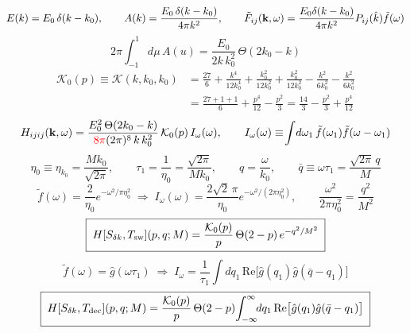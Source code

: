 \documentclass[10pt,prd,aps,nobibnotes,superscriptaddress,preprintnumbers,notitlepage]{revtex4-1}
\newcommand{\add}[1]{{\color{red}#1}}
\newcommand{\add}[1]{#1}
\newcommand{\khat}{\hat{k}}
\newcommand{\kb}{{\bf k}}
\newcommand{\tf}{\tilde{f}}
\begin{document}
\begin{equation}
  E(k)=E_0\,\delta(k-k_0),
  \qquad
  A(k)=\frac{E_0\,\delta(k-k_0)}{4\pi k^2},
  \qquad
  \tilde F_{ij}(\kb,\omega)=\frac{E_0\delta(k-k_0)}{4\pi k^2}P_{ij}(\khat)\tf(\omega)
  \label{A:Fdeltak}
\end{equation}
\begin{equation}
  2\pi\!\int_{-1}^{1}\!\!d\mu\,A(u)=\frac{E_0}{2k\,k_0^2}\,\Theta(2k_0-k)
  \label{A:angulardelta}
\end{equation}
\begin{align}
  \mathcal{K}_0(p)\equiv\mathcal{K}(k,k_0,k_0)
  &=\frac{27}{6}+\frac{k^4}{12k_0^4}+\frac{k_0^2}{12k_0^2}+\frac{k_0^2}{12k_0^2}
   -\frac{k^2}{6k_0^2}-\frac{k^2}{6k_0^2}
  \nonumber\\
  &=\frac{27+1+1}{6}+\frac{p^4}{12}-\frac{p^2}{3}
   =\frac{14}{3}-\frac{p^2}{3}+\frac{p^4}{12}
  \label{A:K0}
\end{align}
\begin{equation}
  H_{ijij}(\kb,\omega)=\frac{E_0^2\,\Theta(2k_0-k)}{\add{8\pi}(2\pi)^8\,k\,k_0^2}\,\mathcal{K}_0(p)\,I_\omega(\omega),
  \qquad
  I_\omega(\omega)\equiv\!\int\!d\omega_1\,\tf(\omega_1)\tf(\omega-\omega_1)
  \label{A:Hdeltak}
\end{equation}
\begin{equation}
  \eta_0\equiv\eta_{k_0}=\frac{M k_0}{\sqrt{2\pi}},
  \qquad
  \tau_1=\frac{1}{\eta_0}=\frac{\sqrt{2\pi}}{M k_0},
  \qquad
  q=\frac{\omega}{k_0},
  \qquad
  \bar q\equiv\omega\tau_1=\frac{\sqrt{2\pi}\,q}{M}
  \label{A:eta0}
\end{equation}
\begin{equation}
  \tf(\omega)=\frac{2}{\eta_0}e^{-\omega^2/\pi\eta_0^2}
  \;\Longrightarrow\;
  I_\omega(\omega)=\frac{2\sqrt2\,\pi}{\eta_0}e^{-\omega^2/(2\pi\eta_0^2)},
  \qquad
  \frac{\omega^2}{2\pi\eta_0^2}=\frac{q^2}{M^2}
  \label{A:Ideltak}
\end{equation}
\begin{equation}
  \boxed{\;
  H[S_{\delta k},T_{\rm sw}](p,q;M)=\frac{\mathcal{K}_0(p)}{p}\,\Theta(2-p)\,e^{-q^2/M^2}\;}
  \label{A:HdeltakSW}
\end{equation}
\begin{equation}
  \tf(\omega)=\hat g(\omega\tau_1)
  \;\Longrightarrow\;
  I_\omega=\frac{1}{\tau_1}\!\int\!dq_1\,\mathrm{Re}\bigl[\hat g(q_1)\hat g(\bar q-q_1)\bigr]
  \label{A:Ideltakdec}
\end{equation}
\begin{equation}
  \boxed{\;
  H[S_{\delta k},T_{\rm dec}](p,q;M)=\frac{\mathcal{K}_0(p)}{p}\,\Theta(2-p)
  \!\int_{-\infty}^{\infty}\!\!dq_1\,\mathrm{Re}\bigl[\hat g(q_1)\hat g(\bar q-q_1)\bigr]\;}
  \label{A:HdeltakDEC}
\end{equation}
\end{document}
